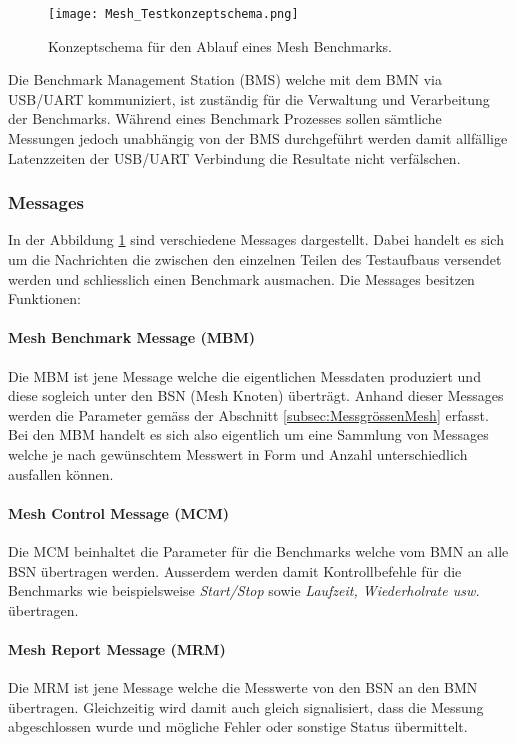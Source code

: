\begin{figure}[h]
	\centering
	\texttt{[image: Mesh\_Testkonzeptschema.png]}
	\caption{Konzeptschema für den Ablauf eines Mesh Benchmarks.}\label{fig:MeshTestKonzept}
\end{figure}

Die Benchmark Management Station (BMS) welche mit dem BMN via USB/UART kommuniziert, ist zuständig für die Verwaltung und Verarbeitung der Benchmarks. Während eines Benchmark Prozesses sollen sämtliche Messungen jedoch unabhängig von der BMS durchgeführt werden damit allfällige Latenzzeiten der USB/UART Verbindung die Resultate nicht verfälschen.

\subsubsection{Messages}\label{subsubsec:Messages}
In der Abbildung \ref{fig:MeshTestKonzept} sind verschiedene Messages dargestellt. Dabei handelt es sich um die Nachrichten die zwischen den einzelnen Teilen des Testaufbaus versendet werden und schliesslich einen Benchmark ausmachen. Die Messages besitzen Funktionen:

\paragraph{Mesh Benchmark Message (MBM)}
Die MBM ist jene Message welche die eigentlichen Messdaten produziert und diese sogleich unter den BSN (Mesh Knoten) überträgt. Anhand dieser Messages werden die Parameter gemäss der Abschnitt \ref{subsec:MessgrössenMesh} erfasst. Bei den MBM handelt es sich also eigentlich um eine Sammlung von Messages welche je nach gewünschtem Messwert in Form und Anzahl unterschiedlich ausfallen können.

\paragraph{Mesh Control Message (MCM)}
Die MCM beinhaltet die Parameter für die Benchmarks welche vom BMN an alle BSN übertragen werden. Ausserdem werden damit Kontrollbefehle für die Benchmarks wie beispielsweise \textit{Start/Stop} sowie \textit{Laufzeit, Wiederholrate usw.} übertragen.

\paragraph{Mesh Report Message (MRM)}
Die MRM ist jene Message welche die Messwerte von den BSN an den BMN übertragen. Gleichzeitig wird damit auch gleich signalisiert, dass die Messung abgeschlossen wurde und mögliche Fehler oder sonstige Status übermittelt.

